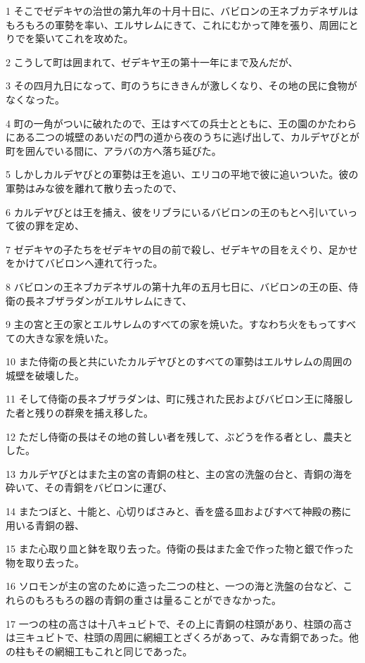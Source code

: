 \par 1 そこでゼデキヤの治世の第九年の十月十日に、バビロンの王ネブカデネザルはもろもろの軍勢を率い、エルサレムにきて、これにむかって陣を張り、周囲にとりでを築いてこれを攻めた。
\par 2 こうして町は囲まれて、ゼデキヤ王の第十一年にまで及んだが、
\par 3 その四月九日になって、町のうちにききんが激しくなり、その地の民に食物がなくなった。
\par 4 町の一角がついに破れたので、王はすべての兵士とともに、王の園のかたわらにある二つの城壁のあいだの門の道から夜のうちに逃げ出して、カルデヤびとが町を囲んでいる間に、アラバの方へ落ち延びた。
\par 5 しかしカルデヤびとの軍勢は王を追い、エリコの平地で彼に追いついた。彼の軍勢はみな彼を離れて散り去ったので、
\par 6 カルデヤびとは王を捕え、彼をリブラにいるバビロンの王のもとへ引いていって彼の罪を定め、
\par 7 ゼデキヤの子たちをゼデキヤの目の前で殺し、ゼデキヤの目をえぐり、足かせをかけてバビロンへ連れて行った。
\par 8 バビロンの王ネブカデネザルの第十九年の五月七日に、バビロンの王の臣、侍衛の長ネブザラダンがエルサレムにきて、
\par 9 主の宮と王の家とエルサレムのすべての家を焼いた。すなわち火をもってすべての大きな家を焼いた。
\par 10 また侍衛の長と共にいたカルデヤびとのすべての軍勢はエルサレムの周囲の城壁を破壊した。
\par 11 そして侍衛の長ネブザラダンは、町に残された民およびバビロン王に降服した者と残りの群衆を捕え移した。
\par 12 ただし侍衛の長はその地の貧しい者を残して、ぶどうを作る者とし、農夫とした。
\par 13 カルデヤびとはまた主の宮の青銅の柱と、主の宮の洗盤の台と、青銅の海を砕いて、その青銅をバビロンに運び、
\par 14 またつぼと、十能と、心切りばさみと、香を盛る皿およびすべて神殿の務に用いる青銅の器、
\par 15 また心取り皿と鉢を取り去った。侍衛の長はまた金で作った物と銀で作った物を取り去った。
\par 16 ソロモンが主の宮のために造った二つの柱と、一つの海と洗盤の台など、これらのもろもろの器の青銅の重さは量ることができなかった。
\par 17 一つの柱の高さは十八キュビトで、その上に青銅の柱頭があり、柱頭の高さは三キュビトで、柱頭の周囲に網細工とざくろがあって、みな青銅であった。他の柱もその網細工もこれと同じであった。
